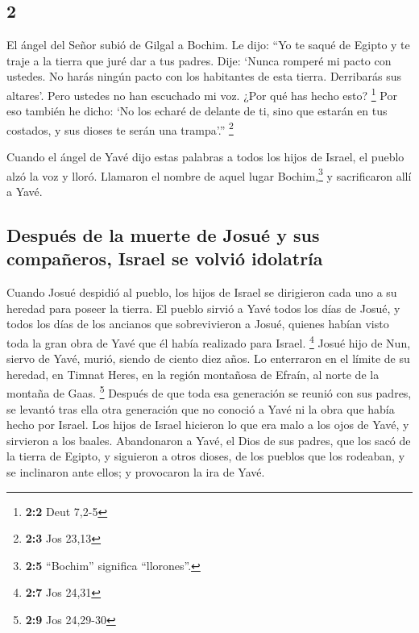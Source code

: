 \begin{paracol}{2}
\hypertarget{section-2}{%
\section{2}\label{section-2}}

 El ángel del Señor subió de Gilgal a Bochim. Le dijo:
``Yo te saqué de Egipto y te traje a la tierra que juré dar a tus
padres. Dije: `Nunca romperé mi pacto con ustedes.  No
harás ningún pacto con los habitantes de esta tierra. Derribarás sus
altares'. Pero ustedes no han escuchado mi voz. ¿Por qué has hecho esto?
\footnote{\textbf{2:2} Deut 7,2-5}  Por eso también he
dicho: `No los echaré de delante de ti, sino que estarán en tus
costados, y sus dioses te serán una trampa'.'' \footnote{\textbf{2:3}
  Jos 23,13}

 Cuando el ángel de Yavé dijo estas palabras a todos los
hijos de Israel, el pueblo alzó la voz y lloró.  Llamaron
el nombre de aquel lugar Bochim,\footnote{\textbf{2:5} ``Bochim''
  significa ``llorones''.} y sacrificaron allí a Yavé.

\hypertarget{despuuxe9s-de-la-muerte-de-josuuxe9-y-sus-compauxf1eros-israel-se-volviuxf3-idolatruxeda}{%
\subsection{Después de la muerte de Josué y sus compañeros, Israel se
volvió
idolatría}\label{despuuxe9s-de-la-muerte-de-josuuxe9-y-sus-compauxf1eros-israel-se-volviuxf3-idolatruxeda}}

 Cuando Josué despidió al pueblo, los hijos de Israel se
dirigieron cada uno a su heredad para poseer la tierra. 
El pueblo sirvió a Yavé todos los días de Josué, y todos los días de los
ancianos que sobrevivieron a Josué, quienes habían visto toda la gran
obra de Yavé que él había realizado para Israel. \footnote{\textbf{2:7}
  Jos 24,31}  Josué hijo de Nun, siervo de Yavé, murió,
siendo de ciento diez años.  Lo enterraron en el límite de
su heredad, en Timnat Heres, en la región montañosa de Efraín, al norte
de la montaña de Gaas. \footnote{\textbf{2:9} Jos 24,29-30}
 Después de que toda esa generación se reunió con sus
padres, se levantó tras ella otra generación que no conoció a Yavé ni la
obra que había hecho por Israel.  Los hijos de Israel
hicieron lo que era malo a los ojos de Yavé, y sirvieron a los baales.
 Abandonaron a Yavé, el Dios de sus padres, que los sacó
de la tierra de Egipto, y siguieron a otros dioses, de los pueblos que
los rodeaban, y se inclinaron ante ellos; y provocaron la ira de Yavé.


\end{paracol}
